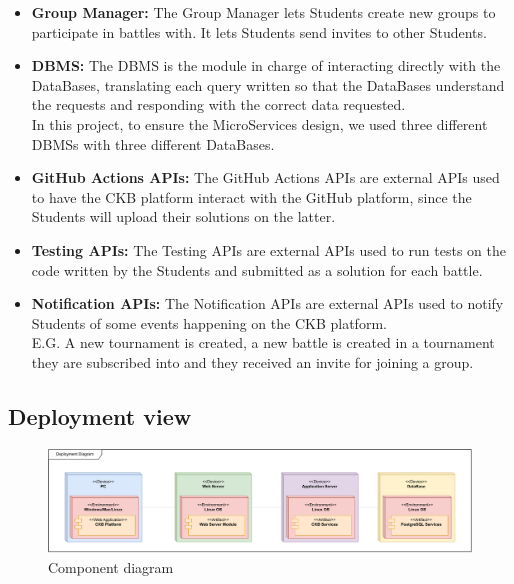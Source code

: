 \documentclass{article}
\begin{document}
{\begin{itemize}
The Evaluation Manager also lets Educators manually evaluate each Student's solution and upload the grade to the platform via the Tournament DBMS.\\
\item \textbf{Group Manager:} The Group Manager lets Students create new groups to participate in battles with. It lets Students send invites to other Students.\\
\item \textbf{DBMS:} The DBMS is the module in charge of interacting directly with the DataBases, translating each query written so that
the DataBases understand the requests and responding with the correct data requested.\\
In this project, to ensure the MicroServices design, we used three different DBMSs with three different DataBases.\\
\item \textbf{GitHub Actions APIs:} The GitHub Actions APIs are external APIs used to have the CKB platform interact with the GitHub platform, since the Students will
upload their solutions on the latter. \\
\item \textbf{Testing APIs:} The Testing APIs are external APIs used to run tests on the code written by the Students and submitted as a solution for each battle.\\
\item \textbf{Notification APIs:} The Notification APIs are external APIs used to notify Students of some events happening on the CKB platform.\\
E.G. A new tournament is created, a new battle is created in a tournament they are subscribed into and they received an invite for joining a group. \\
\end{itemize}
\subsection{Deployment view}
\begin{figure}[H]
    \centering
    \hspace*{-2.6cm}\includegraphics[scale=0.53]{images/DeploymentDiagram.pdf}
    \caption{Component diagram}
    \label{fig:deploymentDiagram}
\end{figure}

}
\end{document}
